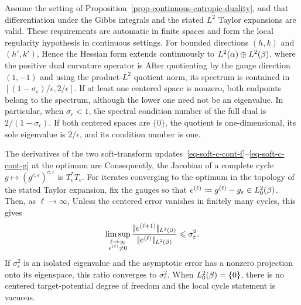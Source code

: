 \begin{prop}\label{prop-sinkhorn-local-rate}
	Assume the setting of Proposition~\ref{prop-continuous-entropic-duality}, and that differentiation under the Gibbs integrals and the stated $L^2$ Taylor expansions are valid. These requirements are automatic in finite spaces and form the local regularity hypothesis in continuous settings. For bounded directions $(h,k)$ and $(h',k')$,
	Hence the Hessian form extends continuously to
	\(L^2(\alpha)\oplus L^2(\beta)\), where the positive dual curvature operator is
	After quotienting by the gauge direction $(1,-1)$ and using the product-$L^2$ quotient norm, its spectrum is contained in $[(1-\sigma_\epsilon)/\epsilon,2/\epsilon]$. If at least one centered space is nonzero, both endpoints belong to the spectrum, although the lower one need not be an eigenvalue. In particular, when $\sigma_\epsilon<1$, the spectral condition number of the full dual is \(2/(1-\sigma_\epsilon)\). If both centered spaces are $\{0\}$, the quotient is one-dimensional, its sole eigenvalue is $2/\epsilon$, and its condition number is one.

	The derivatives of the two soft-transform updates~\eqref{eq-soft-c-cont-f}--\eqref{eq-soft-c-cont-g} at the optimum are
	Consequently, the Jacobian of a complete cycle
	\(g\mapsto(g^{\bar c,\epsilon})^{c,\epsilon}\)
	is $T_\epsilon^*T_\epsilon$. For iterates converging to the optimum in the topology of the stated Taylor expansion, fix the gauges so that
	\(e^{(\ell)}\coloneqq g^{(\ell)}-g_\varepsilon\in L_0^2(\beta)\). Then, as $\ell\to\infty$,
	Unless the centered error vanishes in finitely many cycles, this gives
	\[
		\limsup_{\substack{\ell\to\infty\\e^{(\ell)}\neq0}}
		\frac{|\!| e^{(\ell+1)} |\!|_{L^2(\beta)}}
		{|\!| e^{(\ell)} |\!|_{L^2(\beta)}}
		\leqslant\sigma_\varepsilon^2.
	\]
	If $\sigma_\epsilon^2$ is an isolated eigenvalue and the asymptotic error has a nonzero projection onto its eigenspace, this ratio converges to $\sigma_\epsilon^2$. When $L_0^2(\beta)=\{0\}$, there is no centered target-potential degree of freedom and the local cycle statement is vacuous.
\end{prop}

